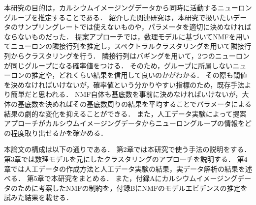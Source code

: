 本研究の目的は，カルシウムイメージングデータから同時に活動するニューロングループを推定することである．
紹介した関連研究は，本研究で扱いたいデータのサンプリングレートでは使えないものや，パラメータを適切に決めなければならないものだった．
提案アプローチでは，数理モデルに基づいてNMFを用いてニューロンの隣接行列を推定し，スペクトラルクラスタリングを用いて隣接行列からクラスタリングを行う．
隣接行列はバギングを用いて，2つのニューロンが同じグループになる確率値をつける．
そのため，グループに所属しないニューロンの推定や，どれくらい結果を信用して良いのかがわかる．
その際も閾値を決めなければいけないが，確率値という分かりやすい指標のため，既存手法より簡単だと思われる．
NMF自体も基底数を事前に決めなければいけないが，大体の基底数を決めればその基底数周りの結果を平均することでパラメータによる結果の劇的な変化を抑えることができる．
また，人工データ実験によって提案アプローチがカルシウムイメージングデータからニューロングループの情報をどの程度取り出せるかを確かめる．

本論文の構成は以下の通りである．
第2章では本研究で使う手法の説明をする．
第3章では数理モデルを元にしたクラスタリングのアプローチを説明する．
第4章では人工データの作成方法と人工データ実験の結果，実データ解析の結果を述べる．
第5章で本研究をまとめる．
また，付録Aにカルシウムイメージングデータのために考案したNMFの制約を，付録BにNMFのモデルエビデンスの推定を試みた結果を載せる．
